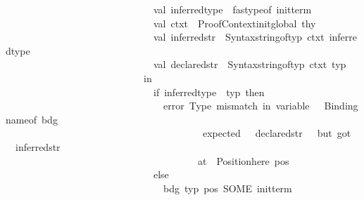 \begin{isabellebody}
\ \ \ \ \ \ \ \ \ \ \ \ \ \ \ \ \ \ \ \ \ \ \ \ \ \ \ \ \ \ val\ inferred{\isacharunderscore}{\kern0pt}type\ {\isacharequal}{\kern0pt}\ fastype{\isacharunderscore}{\kern0pt}of\ init{\isacharunderscore}{\kern0pt}term\isanewline
\ \ \ \ \ \ \ \ \ \ \ \ \ \ \ \ \ \ \ \ \ \ \ \ \ \ \ \ \ \ val\ ctxt\ {\isacharequal}{\kern0pt}\ Proof{\isacharunderscore}{\kern0pt}Context{\isachardot}{\kern0pt}init{\isacharunderscore}{\kern0pt}global\ thy\isanewline
\ \ \ \ \ \ \ \ \ \ \ \ \ \ \ \ \ \ \ \ \ \ \ \ \ \ \ \ \ \ val\ inferred{\isacharunderscore}{\kern0pt}str\ {\isacharequal}{\kern0pt}\ Syntax{\isachardot}{\kern0pt}string{\isacharunderscore}{\kern0pt}of{\isacharunderscore}{\kern0pt}typ\ ctxt\ inferred{\isacharunderscore}{\kern0pt}type\isanewline
\ \ \ \ \ \ \ \ \ \ \ \ \ \ \ \ \ \ \ \ \ \ \ \ \ \ \ \ \ \ val\ declared{\isacharunderscore}{\kern0pt}str\ {\isacharequal}{\kern0pt}\ Syntax{\isachardot}{\kern0pt}string{\isacharunderscore}{\kern0pt}of{\isacharunderscore}{\kern0pt}typ\ ctxt\ typ\isanewline
\ \ \ \ \ \ \ \ \ \ \ \ \ \ \ \ \ \ \ \ \ \ \ \ \ \ \ \ in\isanewline
\ \ \ \ \ \ \ \ \ \ \ \ \ \ \ \ \ \ \ \ \ \ \ \ \ \ \ \ \ \ if\ inferred{\isacharunderscore}{\kern0pt}type\ {\isacharless}{\kern0pt}{\isachargreater}{\kern0pt}\ typ\ then\isanewline
\ \ \ \ \ \ \ \ \ \ \ \ \ \ \ \ \ \ \ \ \ \ \ \ \ \ \ \ \ \ \ \ error\ {\isacharparenleft}{\kern0pt}{\isachardoublequote}{\kern0pt}Type\ mismatch\ in\ variable\ {\isachardoublequote}{\kern0pt}\ {\isacharcircum}{\kern0pt}\ Binding{\isachardot}{\kern0pt}name{\isacharunderscore}{\kern0pt}of\ bdg\ {\isacharcircum}{\kern0pt}\isanewline
\ \ \ \ \ \ \ \ \ \ \ \ \ \ \ \ \ \ \ \ \ \ \ \ \ \ \ \ \ \ \ \ \ \ \ \ \ \ \ {\isachardoublequote}{\kern0pt}{\isacharcolon}{\kern0pt}\ expected\ {\isachardoublequote}{\kern0pt}\ {\isacharcircum}{\kern0pt}\ declared{\isacharunderscore}{\kern0pt}str\ {\isacharcircum}{\kern0pt}\ {\isachardoublequote}{\kern0pt}{\isacharcomma}{\kern0pt}\ but\ got\ {\isachardoublequote}{\kern0pt}\ {\isacharcircum}{\kern0pt}\ inferred{\isacharunderscore}{\kern0pt}str\ {\isacharcircum}{\kern0pt}\ \ \isanewline
\ \ \ \ \ \ \ \ \ \ \ \ \ \ \ \ \ \ \ \ \ \ \ \ \ \ \ \ \ \ \ \ \ \ \ \ \ \ \ {\isachardoublequote}{\kern0pt}at\ {\isachardoublequote}{\kern0pt}\ {\isacharcircum}{\kern0pt}Position{\isachardot}{\kern0pt}here\ pos{\isacharparenright}{\kern0pt}\isanewline
\ \ \ \ \ \ \ \ \ \ \ \ \ \ \ \ \ \ \ \ \ \ \ \ \ \ \ \ \ \ else\isanewline
\ \ \ \ \ \ \ \ \ \ \ \ \ \ \ \ \ \ \ \ \ \ \ \ \ \ \ \ \ \ \ \ {\isacharparenleft}{\kern0pt}bdg{\isacharcomma}{\kern0pt}\ typ{\isacharcomma}{\kern0pt}\ pos{\isacharcomma}{\kern0pt}\ SOME\ init{\isacharunderscore}{\kern0pt}term{\isacharparenright}{\kern0pt}\isanewline

\end{isabellebody}
